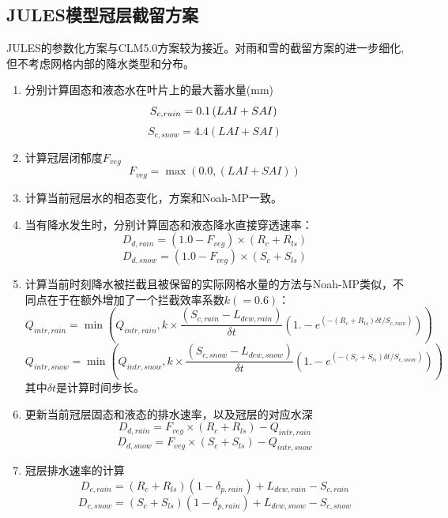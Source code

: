 \subsection{JULES模型冠层截留方案}
JULES的参数化方案与CLM5.0方案较为接近。对雨和雪的截留方案的进一步细化,但不考虑网格内部的降水类型和分布。
\begin{enumerate}
\item 分别计算固态和液态水在叶片上的最大蓄水量(mm)\\
\begin{equation}
S_{c,rain}=0.1\left(LAI+SAI\right)\\
\end{equation}
\begin{equation}
S_{c,snow}=4.4\left(LAI+SAI\right)
\end{equation}
\item 计算冠层闭郁度$F_{veg}$
\begin{equation}
F_{veg} = \max(0.0,\left(LAI+SAI\right))
\end{equation}

\item 计算当前冠层水的相态变化，方案和Noah-MP一致。

\item 当有降水发生时，分别计算固态和液态降水直接穿透速率：
\begin{equation}
D_{d,rain}=\left(1.0-F_{veg}\right) \times (R_{c}+R_{ls})
\end{equation}
\begin{equation}
D_{d,snow}=\left(1.0-F_{veg}\right) \times (S_{c}+S_{ls})
\end{equation}
\item 计算当前时刻降水被拦截且被保留的实际网格水量的方法与Noah-MP类似，不同点在于在额外增加了一个拦截效率系数$k(=0.6)$：
\begin{equation}
Q_{intr,rain} = \min(Q_{intr,rain},  k \times \frac{(S_{c,rain} - L_{dew,rain})}{\delta{t}}  (1.-e^{(-\left(R_{c}+R_{ls}\right)\delta{t}/S_{c,rain})}) )
\end{equation}
\begin{equation}
Q_{intr,snow} = \min(Q_{intr,snow}, k \times \frac{(S_{c,snow} - L_{dew,snow})}{\delta{t}} (1.-e^{(-\left(S_{c}+S_{ls}\right)\delta{t}/S_{c,snow})}) )
\end{equation}
其中${\delta{t}}$是计算时间步长。
\item 更新当前冠层固态和液态的排水速率，以及冠层的对应水深
\begin{equation}
D_{d,rain}=F_{veg} \times (R_{c}+R_{ls})-Q_{intr,rain}
\end{equation}
\begin{equation}
D_{d,snow}=F_{veg} \times (S_{c}+S_{ls})-Q_{intr,snow}
\end{equation}
\item 冠层排水速率的计算
\begin{equation}
D_{c,rain}=\left(R_{c}+R_{ls}\right)\left(1-\delta_{p,rain}\right)+L_{dew,rain}-S_{c,rain}
\end{equation}
\begin{equation}
D_{c,snow}=\left(S_{c}+S_{ls}\right)\left(1-\delta_{p,rain}\right)+L_{dew,snow}-S_{c,snow}
\end{equation}


\end{enumerate}
